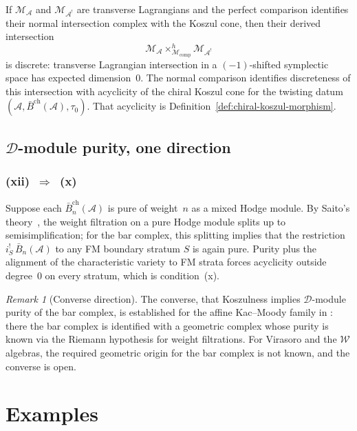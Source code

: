 \documentclass[11pt,reqno]{amsart}
\theoremstyle{definition}
\theoremstyle{remark}
\newtheorem{remark}[theorem]{Remark}
\newcommand{\cA}{\mathcal{A}}
\newcommand{\cM}{\mathcal{M}}
\newcommand{\cD}{\mathcal{D}}
\newcommand{\cW}{\mathcal{W}}
\newcommand{\barB}{\bar{B}}
\newcommand{\barBgeom}{\bar{B}^{\mathrm{ch}}}
\numberwithin{equation}{section}
\begin{document}
If $\cM_\cA$ and $\cM_{\cA^!}$ are transverse Lagrangians and the
perfect comparison identifies their normal intersection complex
with the Koszul cone, then
their derived intersection
\[
\cM_\cA \times^h_{\cM_{\mathrm{comp}}} \cM_{\cA^!}
\]
is discrete: transverse Lagrangian intersection in a
$(-1)$-shifted symplectic space has expected dimension~$0$. The
normal comparison identifies discreteness of this intersection with
acyclicity of the chiral Koszul cone for the twisting datum
$(\cA,\barBgeom(\cA),\tau_0)$. That acyclicity is
Definition~\ref{def:chiral-koszul-morphism}.

\subsection{\textup{$\cD$}-module purity, one direction}

\subsubsection*{\textup{(xii)}~$\Rightarrow$~\textup{(x)}}

Suppose each $\barBgeom_n(\cA)$ is pure of weight~$n$ as a mixed
Hodge module. By Saito's theory~\cite{Saito}, the weight
filtration on a pure Hodge module splits up to semisimplification;
for the bar complex, this splitting implies that the restriction
$i_S^!\,\barB_n(\cA)$ to any FM boundary stratum $S$ is again
pure. Purity plus the alignment of the characteristic variety to
FM strata forces acyclicity outside degree~$0$ on every stratum,
which is condition~(x).

\begin{remark}[Converse direction]
\label{rem:d-module-purity-content}
The converse, that Koszulness implies $\cD$-module purity of the
bar complex, is established for the affine Kac--Moody family in
\cite[Prop.~7.5]{LorgatMKD1}: there the bar complex is identified
with a geometric complex whose purity is known via the Riemann
hypothesis for weight filtrations. For Virasoro and the $\cW$
algebras, the required geometric origin for the bar complex is not
known, and the converse is open.
\end{remark}

\section{Examples}
\label{sec:examples}
\end{document}
